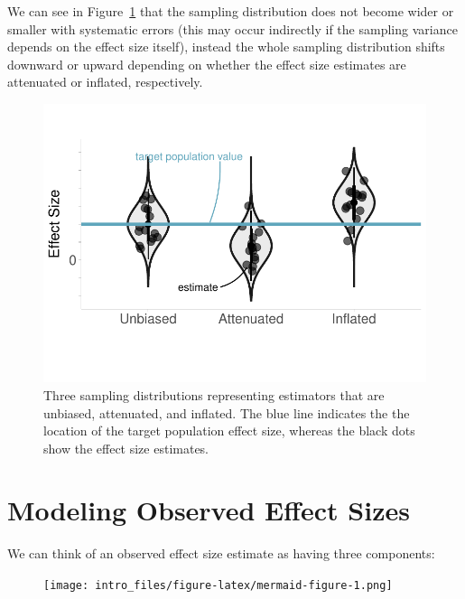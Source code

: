 \documentclass[
  letterpaper,
  DIV=11,
  numbers=noendperiod]{scrreprt}
\begin{document}
We can see in Figure~\ref{fig-systematic-errors} that the sampling
distribution does not become wider or smaller with systematic errors
(this may occur indirectly if the sampling variance depends on the
effect size itself), instead the whole sampling distribution shifts
downward or upward depending on whether the effect size estimates are
attenuated or inflated, respectively.

\begin{figure}[H]

{\centering \includegraphics{intro_files/figure-pdf/fig-systematic-errors-1.pdf}

}

\caption{\label{fig-systematic-errors}Three sampling distributions
representing estimators that are unbiased, attenuated, and inflated. The
blue line indicates the the location of the target population effect
size, whereas the black dots show the effect size estimates.}

\end{figure}

\hypertarget{modeling-observed-effect-sizes}{%
\section{Modeling Observed Effect
Sizes}\label{modeling-observed-effect-sizes}}

We can think of an observed effect size estimate as having three
components:

\begin{figure}[H]

{\centering \texttt{[image: intro\_files/figure-latex/mermaid-figure-1.png]}

}

\end{figure}
\end{document}
